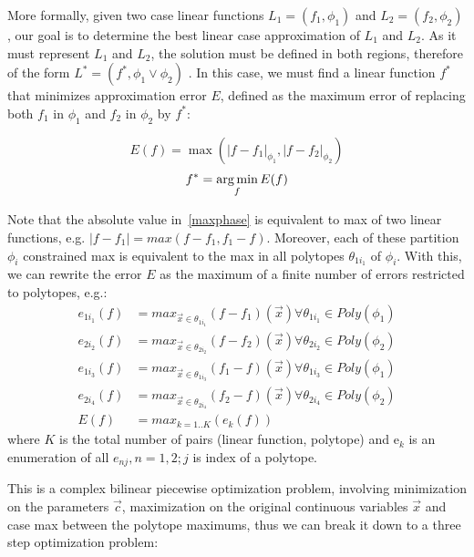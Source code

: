 More formally, given two case linear functions $L_1 = ( f_1, \phi_1 )$ and $L_2 = ( f_2, \phi_2 )$, our goal is to determine the best linear case approximation of $L_1$ and $L_2$. As it must represent  $L_1$ and $L_2$, the solution must be defined in both regions, therefore of the form $L^* = (f^*,\phi_1 \lor  \phi_2)$ . In this case, we must find a linear function $f^*$ that minimizes approximation error $E$, defined as the maximum  error of replacing both $f_1$ in $\phi_1$ and $f_2$ in $\phi_2$ by $f^*$:

\begin{equation} E(f) = \max ( |f - f_1|_{\phi_1} , |f - f_2|_{\phi_2} ) \label{maxphase} \end{equation}
\begin{equation} f^* = \argmin_f E(f)  \label{minphase} \end{equation}

Note that the absolute value in~\ref{maxphase} is equivalent to max of two linear functions, e.g. $|f - f_1| = max ( f - f_1, f_1 - f)$. Moreover, each of these partition $\phi_i$ constrained max is equivalent to the max in all polytopes $\theta_{1{i_1}}$ of $\phi_i$. With this, we can rewrite the error $E$ as the maximum of a finite number of errors restricted to polytopes, e.g.:
{\footnotesize 
\begin{align}
 e_{1{i_1}}(f) &= max_{\vec{x} \in \theta_{1{i_1}}} (f - f_1)(\vec{x}) \forall \theta_{1{i_1}} \in Poly(\phi_1) \nonumber\\
 e_{2{i_2}}(f) &= max_{\vec{x} \in \theta_{2{i_2}}} (f - f_2)(\vec{x}) \forall \theta_{2{i_2}} \in Poly(\phi_2) \nonumber\\
 e_{1{i_3}}(f) &= max_{\vec{x} \in \theta_{1{i_3}}} (f_1 - f)(\vec{x}) \forall \theta_{1{i_3}} \in Poly(\phi_1) \nonumber\\
 e_{2{i_4}}(f) &= max_{\vec{x} \in \theta_{2{i_4}}} (f_2 - f)(\vec{x}) \forall \theta_{2{i_4}} \in Poly(\phi_2)\nonumber\\
E(f) &= max_{k=1..K} (e_k(f)) \nonumber
\end{align}
where $K$ is the total number of pairs (linear function, polytope)  and e$ _k$ is an enumeration of all $e_{nj}, n = 1,2; j $ is index of a polytope.
}

This is a complex bilinear piecewise optimization problem, involving minimization on the parameters $\vec{c}$, maximization on the original continuous variables $\vec{x}$ and case max between the polytope maximums, thus we can break it down to a three step optimization problem: 

